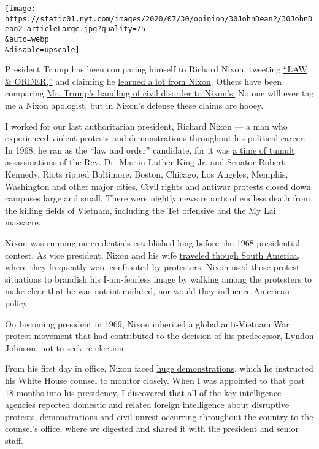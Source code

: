 \texttt{[image: https://static01.nyt.com/images/2020/07/30/opinion/30JohnDean2/30JohnDean2-articleLarge.jpg?quality=75\\\&auto=webp\\\&disable=upscale]}

President Trump has been comparing himself to Richard Nixon, tweeting
\href{https://twitter.com/realDonaldTrump/status/1267227396341669889}{``LAW
\& ORDER,''} and claiming he
\href{https://www.youtube.com/watch?v=mY12Llo847I}{learned a lot from
Nixon}. Others have been comparing
\href{https://www.nytimes.com/2020/06/02/opinion/floyd-trump-nixon-coronavirus.html}{Mr.
Trump's handling of civil disorder to Nixon's.} No one will ever tag me
a Nixon apologist, but in Nixon's defense these claims are hooey.

I worked for our last authoritarian president, Richard Nixon --- a man
who experienced violent protests and demonstrations throughout his
political career. In 1968, he ran as the ``law and order'' candidate,
for it was
\href{https://www.theguardian.com/us-news/2020/jun/16/trump-nixon-1968-law-and-order-america}{a
time of tumult}: assassinations of the Rev. Dr. Martin Luther King Jr.
and Senator Robert Kennedy. Riots ripped Baltimore, Boston, Chicago, Los
Angeles, Memphis, Washington and other major cities. Civil rights and
antiwar protests closed down campuses large and small. There were
nightly news reports of endless death from the killing fields of
Vietnam, including the Tet offensive and the My Lai massacre.

Nixon was running on credentials established long before the 1968
presidential contest. As vice president, Nixon and his wife
\href{https://history.state.gov/historicaldocuments/frus1958-60v05/comp4}{traveled
though South America}, where they frequently were confronted by
protesters. Nixon used those protest situations to brandish his
I-am-fearless image by walking among the protesters to make clear that
he was not intimidated, nor would they influence American policy.

On becoming president in 1969, Nixon inherited a global anti-Vietnam War
protest movement that had contributed to the decision of his
predecessor, Lyndon Johnson, not to seek re-election.

From his first day in office, Nixon faced
\href{https://learning.blogs.nytimes.com/2011/11/15/nov-15-1969-anti-vietnam-war-demonstration-held/}{huge
demonstrations,} which he instructed his White House counsel to monitor
closely. When I was appointed to that post 18 months into his
presidency, I discovered that all of the key intelligence agencies
reported domestic and related foreign intelligence about disruptive
protests, demonstrations and civil unrest occurring throughout the
country to the counsel's office, where we digested and shared it with
the president and senior staff.


